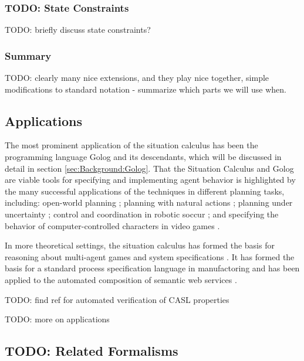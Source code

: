 \subsubsection{TODO: State Constraints}

TODO: briefly discuss state constraints? \citep{Lin94-StateConstraints}


\subsubsection{Summary}

TODO: clearly many nice extensions, and they play nice together, simple
modifications to standard notation - summarize which parts we will
use when.


\subsection{Applications}

The most prominent application of the situation calculus has been
the programming language Golog \citep{levesque97golog} and its descendants,
which will be discussed in detail in section \ref{sec:Background:Golog}.
That the Situation Calculus and Golog are viable tools for specifying
and implementing agent behavior is highlighted by the many successful
applications of the techniques in different planning tasks, including:
open-world planning \citep{Finzi00open_world_sitcalc}; planning with
natural actions \citep{pirri00planning_nat_acts}; planning under
uncertainty \citep{baier03golog_planning}; control and coordination
in robotic soccur \citep{Ferrein2005readylog}; and specifying the
behavior of computer-controlled characters in video games \citep{jacobs05unrealgolog}.

In more theoretical settings, the situation calculus has formed the
basis for reasoning about multi-agent games \citep{delgrande01sitcalc_cleudo}
and system specifications \citep{shapiro02casl,lesperance05ecasl}.
It has formed the basis for a standard process specification language
in manufactoring \citep{gruninger04psl} and has been applied to the
automated composition of semantic web services \citep{mcilraith02golog_web_services}.

TODO: find ref for automated verification of CASL properties

TODO: more on applications


\subsection{TODO: Related Formalisms}

